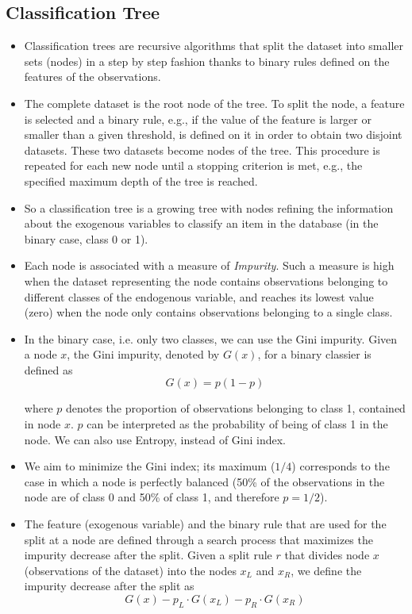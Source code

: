 \subsection{Classification Tree}
\begin{itemize}
    \item Classification trees are recursive algorithms that split the dataset into smaller sets (nodes) in a step by step fashion thanks to binary rules defined on the features of the observations. 
    \item The complete dataset is the root node of the tree. To split the node, a feature is selected and a binary rule, e.g., if the value of the feature is larger or smaller than a given threshold, is defined on it in order to obtain two disjoint datasets. These two datasets become nodes of the tree. This procedure is repeated for each new node until a stopping criterion is met, e.g., the specified maximum depth of the tree is reached. 
    \item So a classification tree is a growing tree with nodes refining the information about the exogenous variables to classify an item in the database (in the binary case, class 0 or 1). 
    \item Each node is associated with a measure of \textit{Impurity}. Such a measure is high when the dataset representing the node contains observations belonging to different classes of the endogenous variable, and reaches its lowest value (zero) when the node only contains observations belonging to a single class.
    \item In the binary case, i.e. only two classes, we can use the Gini impurity. Given a node $x$, the Gini impurity, denoted by $G( x)$, for a binary classier is defined as
          \begin{equation*}
              G( x) =p( 1-p)
          \end{equation*}
          
          where $p$ denotes the proportion of observations belonging to class 1, contained in node $x$. $p$ can be interpreted as the probability of being of class 1 in the node. We can also use Entropy, instead of Gini index.
    \item We aim to minimize the Gini index; its maximum ($1/4$) corresponds to the case in which a node is perfectly balanced (50\% of the observations in the node are of class 0 and 50\% of class 1, and therefore $p=1/2$).
    \item The feature (exogenous variable) and the binary rule that are used for the split at a node are defined through a search process that maximizes the impurity decrease after the split. Given a split rule $r$ that divides node $x$ (observations of the dataset) into the nodes $x_{L}$ and $x_{R}$, we define the impurity decrease after the split as
          \begin{equation*}
              G\left( x\right) -p_{L} \cdot G\left( x_{L}\right) -p_{R} \cdot G\left( x_{R}\right)
          \end{equation*}
          

\end{itemize}
